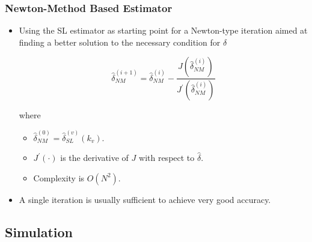 

\begin{frame}
  \frametitle{Newton-Method Based Estimator}

    \begin{itemize}
    
      \item Using the SL estimator as starting point for a Newton-type iteration aimed at finding a better solution to the necessary condition for $\hat{\delta}$
      
      \begin{equation*}
        \label{eq:iter_NM_est}
        \hat{\delta}_{NM}^{(i+1)}=\hat{\delta}_{NM}^{(i)}-
        \frac{J(\hat{\delta}_{NM}^{(i)})}{J^\prime(\hat{\delta}_{NM}^{(i)})}
      \end{equation*}

      where
      \begin{itemize}
        \item $\hat{\delta}_{NM}^{(0)}=\hat{\delta}^{(v)}_{SL}(k_v)$.
        \item $J^\prime(\cdot)$ is the derivative of $J$ with respect to $\hat{\delta}$.
        \item Complexity is $O(N^2)$.
      \end{itemize}

      \item A single iteration is usually sufficient to achieve very good accuracy.
        

    \end{itemize}




\end{frame}

\subsection{Simulation}

